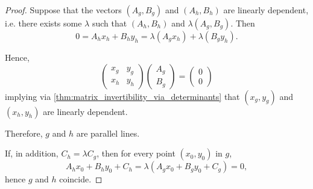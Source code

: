 \begin{proof}
  Suppose that the vectors \( (A_g, B_g) \) and \( (A_h, B_h) \) are linearly dependent, i.e. there exists some \( \lambda \) such that \( (A_h, B_h) \) and \( \lambda (A_g, B_g) \). Then
  \begin{equation*}
    0 = A_h x_h + B_h y_h = \lambda (A_g x_h) + \lambda (B_g y_h).
  \end{equation*}

  Hence,
  \begin{equation*}
    \begin{pmatrix}
      x_g & y_g \\
      x_h & y_h
    \end{pmatrix}
    \begin{pmatrix}
      A_g \\ B_g
    \end{pmatrix}
    =
    \begin{pmatrix}
      0 \\ 0
    \end{pmatrix}
  \end{equation*}
  implying via \cref{thm:matrix_invertibility_via_determinants} that \( (x_g, y_g) \) and \( (x_h, y_h) \) are linearly dependent.

  Therefore, \( g \) and \( h \) are parallel lines.

  If, in addition, \( C_h = \lambda C_g \), then for every point \( (x_0, y_0) \) in \( g \),
  \begin{equation*}
    A_h x_0 + B_h y_0 + C_h = \lambda (A_g x_0 + B_g y_0 + C_g) = 0,
  \end{equation*}
  hence \( g \) and \( h \) coincide.
\end{proof}


